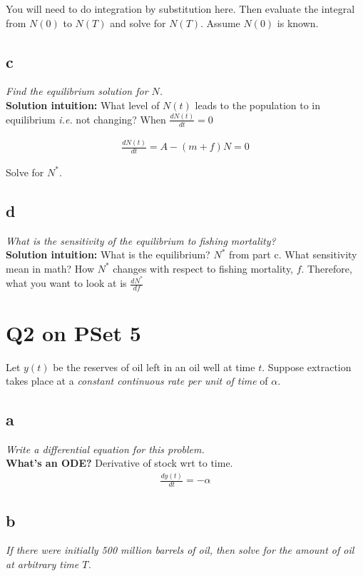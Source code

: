\documentclass{article}
\begin{document}
You will need to do integration by substitution here. Then evaluate the integral from $N(0)$ to $N(T)$ and solve for $N(T)$. Assume $N(0)$ is known. 


\subsection{c}
\textit{Find the equilibrium solution for $N$.}\\

\textbf{Solution intuition:} What level of $N(t)$ leads to the population to in equilibrium \textit{i.e.} not changing? When $\frac{dN(t)}{dt} = 0 $

\begin{align*}
   \frac{dN(t)}{dt} = A - (m +f)N = 0 
\end{align*}

Solve for $N^*$.

\subsection{d}
\textit{What is the sensitivity of the equilibrium to fishing mortality?}\\

\textbf{Solution intuition:} What is the equilibrium? $N^*$ from part c. What sensitivity mean in math? How $N^*$ changes with respect to fishing mortality, $f$. Therefore, what you want to look at is $\frac{d N^*}{d f}$

\section{Q2 on PSet 5}
Let $y(t)$ be the reserves of oil left in an oil well at time $t$. Suppose extraction takes place at a \textit{constant continuous rate per unit of time} of $\alpha$. 

\subsection{a}
\textit{Write a differential equation for this problem.}\\

\textbf{What's an ODE?} Derivative of stock wrt to time. 
\begin{align*}
    \frac{d y(t)}{dt} = - \alpha
\end{align*}

\subsection{b}
\textit{If there were initially 500 million barrels of oil, then solve for the amount of oil at arbitrary time $T$.}\\
\end{document}
